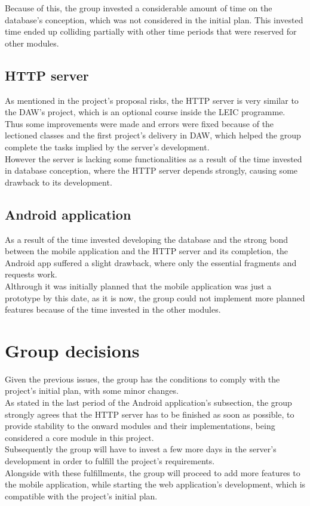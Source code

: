     Because of this, the group invested a considerable amount of time on the database's conception, which was not considered
    in the initial plan. This invested time ended up colliding partially with other time periods that were
    reserved for other modules.

    \subsection{HTTP server}

    As mentioned in the project's proposal risks, the HTTP server is very similar to the DAW's project, which is an optional
    course inside the LEIC programme. Thus some improvements were made and errors were fixed because of the lectioned classes 
    and the first project's delivery in DAW, which helped the group complete the tasks implied by the server's development.\\

    However the server is lacking some functionalities as a result of the time invested in database conception,
    where the HTTP server depends strongly, causing some drawback to its development.

    \subsection{Android application}

    As a result of the time invested developing the database and the strong bond between the mobile application and the HTTP server 
    and its completion, the Android app suffered a slight drawback, where only the essential fragments and requests work.\\

    Althrough it was initially planned that the mobile application was just a prototype by this date, as it is now, the group
    could not implement more planned features because of the time invested in the other modules.

    \section{Group decisions}

    Given the previous issues, the group has the conditions to comply with the project's initial plan, with some minor changes.\\
    
    As stated in the last period of the Android application's subsection, the group strongly agrees that the HTTP server has to be finished
    as soon as possible, to provide stability to the onward modules and their implementations, being considered a core module in this project.\\

    Subsequently the group will have to invest a few more days in the server's development in order to fulfill the project's requirements.\\

    Alongside with these fulfillments, the group will proceed to add more features to the mobile application, while starting the web application's development,
    which is compatible with the project's initial plan.